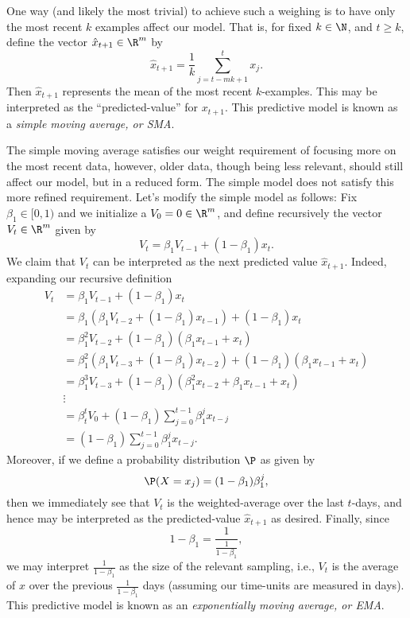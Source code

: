 One way (and likely the most trivial) to achieve such a weighing is to have only the most recent $k$ examples affect our model.  That is, for fixed $k\in\N$, and $t\geq k$, define the vector $\hat{x}_{t+1}\in\R^m$ by
$$\hat{x}_{t+1}=\frac{1}{k}\sum_{j=t-mk+1}^tx_j.$$
Then $\hat{x}_{t+1}$ represents the mean of the most recent $k$-examples.  This may be interpreted as the ``predicted-value'' for $x_{t+1}$.  This predictive model is known as a \textit{simple moving average, or SMA}.

The simple moving average satisfies our weight requirement of focusing more on the most recent data, however, older data, though being less relevant, should still affect our model, but in a reduced form.  The simple model does not satisfy this more refined requirement.  Let's modify the simple model as follows:  Fix $\beta_1\in[0,1)$ and we initialize a $V_0=0\in\R^m$, and define recursively the vector $V_t\in\R^m$ given by
$$V_t=\beta_1V_{t-1}+(1-\beta_1)x_t.$$
We claim that $V_t$ can be interpreted as the next predicted value $\hat{x}_{t+1}$.  Indeed, expanding our recursive definition
\begin{align*}
	V_t&=\beta_1V_{t-1}+(1-\beta_1)x_t\\
	&=\beta_1(\beta_1V_{t-2}+(1-\beta_1)x_{t-1})+(1-\beta_1)x_t\\
	&=\beta_1^2V_{t-2}+(1-\beta_1)(\beta_1x_{t-1}+x_t)\\
	&=\beta_1^2(\beta_1V_{t-3}+(1-\beta_1)x_{t-2})+(1-\beta_1)(\beta_1x_{t-1}+x_t)\\
	&=\beta_1^3V_{t-3}+(1-\beta_1)(\beta_1^2x_{t-2}+\beta_1x_{t-1}+x_t)\\
	&\vdots\\
	&=\beta_t^tV_0+(1-\beta_1)\sum_{j=0}^{t-1}\beta_1^jx_{t-j}\\
	&=(1-\beta_1)\sum_{j=0}^{t-1}\beta_1^jx_{t-j}.
\end{align*}
Moreover, if we define a probability distribution $\P$ as given by
$$\P(X=x_j)=(1-\beta_1)\beta_1^j,$$
then we immediately see that $V_t$ is the weighted-average over the last $t$-days, and hence may be interpreted as the predicted-value $\hat{x}_{t+1}$ as desired.  Finally, since
$$1-\beta_1=\frac{1}{\frac{1}{1-\beta_1}},$$
we may interpret $\frac{1}{1-\beta_1}$ as the size of the relevant sampling, i.e., $V_t$ is the average of $x$ over the previous $\frac{1}{1-\beta_1}$ days (assuming our time-units are measured in days).  This predictive model is known as an \textit{exponentially moving average, or EMA}.

